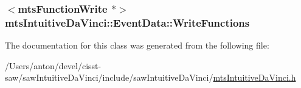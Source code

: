 \subsubsection[{Write\+Functions}]{$<${\bf mts\+Function\+Write} $\ast$$>$ mts\+Intuitive\+Da\+Vinci\+::\+Event\+Data\+::\+Write\+Functions}\label{classmts_intuitive_da_vinci_1_1_event_data_a58379f1c62378447780d1b5a7017be47}


The documentation for this class was generated from the following file\+:\begin{DoxyCompactItemize}
\item 
/\+Users/anton/devel/cisst-\/saw/saw\+Intuitive\+Da\+Vinci/include/saw\+Intuitive\+Da\+Vinci/\hyperlink{mts_intuitive_da_vinci_8h}{mts\+Intuitive\+Da\+Vinci.\+h}\end{DoxyCompactItemize}
